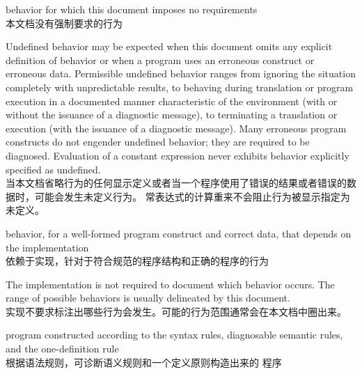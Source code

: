 %
behavior for which this document
imposes no requirements \\
本文档没有强制要求的行为

\begin{defnote}
Undefined behavior may be expected when
this document omits any explicit
definition of behavior or when a program uses an erroneous construct or erroneous data.
Permissible undefined behavior ranges
from ignoring the situation completely with unpredictable results, to
behaving during translation or program execution in a documented manner
characteristic of the environment (with or without the issuance of a
diagnostic message), to terminating a translation or execution (with the
issuance of a diagnostic message). Many erroneous program constructs do
not engender undefined behavior; they are required to be diagnosed.
Evaluation of a constant expression never exhibits behavior explicitly
specified as undefined. \\
当本文档省略行为的任何显示定义或者当一个程序使用了错误的结果或者错误的数据时，可能会发生未定义行为。
常表达式的计算重来不会阻止行为被显示指定为未定义。
\end{defnote}

%
behavior, for a well-formed program construct and correct data, that
depends on the implementation \\
依赖于实现，针对于符合规范的程序结构和正确的程序的行为

\begin{defnote}
The implementation is not required to
document which behavior occurs. The range of
possible behaviors is usually delineated by this document. \\
实现不要求标注出哪些行为会发生。可能的行为范围通常会在本文档中圈出来。
\end{defnote}

%
\Cpp{}  program constructed according to the syntax rules, diagnosable
semantic rules, and the one-definition rule \\
根据语法规则，可诊断语义规则和一个定义原则构造出来的 \Cpp{} 程序

